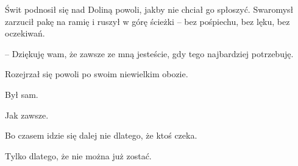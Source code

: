 \par\indent Świt podnosił się nad Doliną powoli, jakby nie chciał go spłoszyć. Swaromysł zarzucił pakę na ramię i ruszył w górę ścieżki -- bez pośpiechu, bez lęku, bez oczekiwań.
\par\noindent-- Dziękuję wam, że zawsze ze mną jesteście, gdy tego najbardziej potrzebuję. 
\par\noindent Rozejrzał się powoli po swoim niewielkim obozie. 
\par\noindent Był sam.
\par\noindent Jak zawsze.
\par\noindent Bo czasem idzie się dalej nie dlatego, że ktoś czeka.
\par\noindent Tylko dlatego, że nie można już zostać.